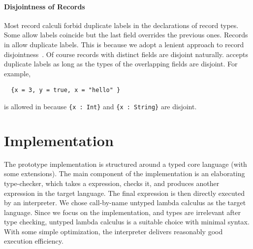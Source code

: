 \paragraph{Disjointness of Records}

Most record calculi forbid duplicate labels in the declarations of record types.
Some allow labels coincide but the last field overrides the previous ones.
Records in \name allow duplicate labels. This is because we adopt a lenient
approach to record disjointness~\cite{alpuimdisjoint}. Of course records with
distinct fields are disjoint naturally. \name accepts duplicate labels as long
as the types of the overlapping fields are disjoint. For example,
\begin{lstlisting}
  {x = 3, y = true, x = "hello" }
\end{lstlisting}
is allowed in \name because \lstinline${x : Int}$ and \lstinline${x : String}$ are
disjoint.

\section{Implementation}

The \name prototype implementation is structured around a typed core language
(\bname with some extensions). The main component of the implementation is an
elaborating type-checker, which takes a \bname expression, checks it, and
produces another expression in the target language. The final expression is then
directly executed by an interpreter. We chose call-by-name untyped lambda
calculus as the target language. Since we focus on the implementation, and types
are irrelevant after type checking, untyped lambda calculus is a suitable choice
with minimal syntax. With some simple optimization, the interpreter delivers
reasonably good execution efficiency.

